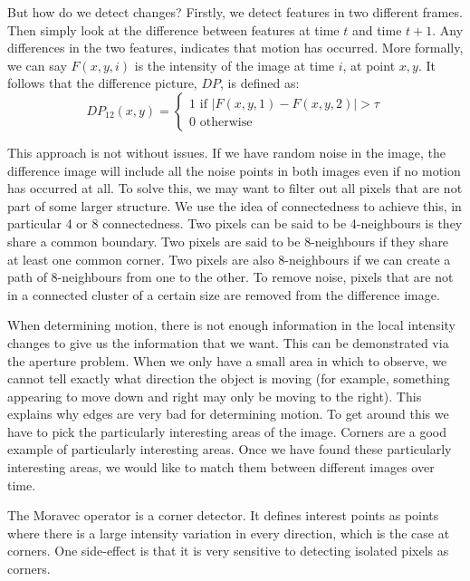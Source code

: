 \documentclass{article}
\begin{document}
	But how do we detect changes? Firstly, we detect features in two different frames. Then simply look at the difference between features at time $t$ and time $t + 1$. Any differences in the two features, indicates that motion has occurred. More formally, we can say $F(x, y, i)$ is the intensity of the image at time $i$, at point $x, y$. It follows that the difference picture, $DP$, is defined as:
	\[ DP_{12}(x, y) = \begin{cases}
		1 \text{ if } |F(x, y, 1) - F(x, y, 2)| > \tau \\
		0 \text{ otherwise}
		\end{cases} \]
		
	This approach is not without issues. If we have random noise in the image, the difference image will include all the noise points in both images even if no motion has occurred at all. To solve this, we may want to filter out all pixels that are not part of some larger structure. We use the idea of connectedness to achieve this, in particular 4 or 8 connectedness. Two pixels can be said to be 4-neighbours is they share a common boundary. Two pixels are said to be 8-neighbours if they share at least one common corner. Two pixels are also 8-neighbours if we can create a path of 8-neighbours from one to the other. To remove noise, pixels that are not in a connected cluster of a certain size are removed from the difference image.
	
	\par 
	When determining motion, there is not enough information in the local intensity changes to give us the information that we want. This can be demonstrated via the aperture problem. When we only have a small area in which to observe, we cannot tell exactly what direction the object is moving (for example, something appearing to move down and right may only be moving to the right). This explains why edges are very bad for determining motion. To get around this we have to pick the particularly interesting areas of the image. Corners are a good example of particularly interesting areas. Once we have found these particularly interesting areas, we would like to match them between different images over time.
	
	\par 
	The Moravec operator is a corner detector. It defines interest points as points where there is a large intensity variation in every direction, which is the case at corners. One side-effect is that it is very sensitive to detecting isolated pixels as corners.
	
\end{document}
